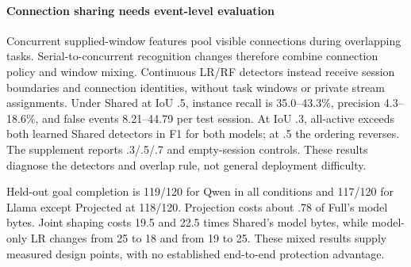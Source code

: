 \paragraph{Connection sharing needs event-level evaluation}
Concurrent supplied-window features pool visible connections during overlapping tasks. Serial-to-concurrent recognition changes therefore combine connection policy and window mixing. Continuous LR/RF detectors instead receive session boundaries and connection identities, without task windows or private stream assignments. Under Shared at IoU .5, instance recall is 35.0--43.3\%, precision 4.3--18.6\%, and false events 8.21--44.79 per test session. At IoU .3, all-active exceeds both learned Shared detectors in F1 for both models; at .5 the ordering reverses. The supplement reports .3/.5/.7 and empty-session controls. These results diagnose the detectors and overlap rule, not general deployment difficulty.

Held-out goal completion is 119/120 for Qwen in all conditions and 117/120 for Llama except Projected at 118/120. Projection costs about .78 of Full's model bytes. Joint shaping costs 19.5 and 22.5 times Shared's model bytes, while model-only LR changes from 25 to 18 and from 19 to 25. These mixed results supply measured design points, with no established end-to-end protection advantage.
